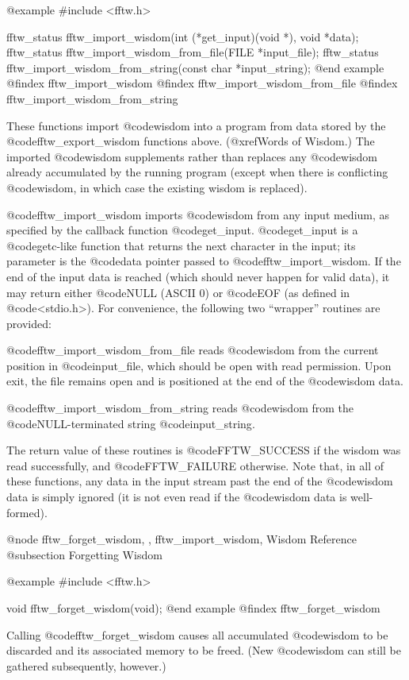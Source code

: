 @example
#include <fftw.h>

fftw_status fftw_import_wisdom(int (*get_input)(void *), void *data);
fftw_status fftw_import_wisdom_from_file(FILE *input_file);
fftw_status fftw_import_wisdom_from_string(const char *input_string);
@end example
@findex fftw_import_wisdom
@findex fftw_import_wisdom_from_file
@findex fftw_import_wisdom_from_string

These functions import @code{wisdom} into a program from data stored by
the @code{fftw_export_wisdom} functions above. (@xref{Words of Wisdom}.)
The imported @code{wisdom} supplements rather than replaces any
@code{wisdom} already accumulated by the running program (except when
there is conflicting @code{wisdom}, in which case the existing wisdom is
replaced).

@code{fftw_import_wisdom} imports @code{wisdom} from any input medium,
as specified by the callback function @code{get_input}. @code{get_input}
is a @code{getc}-like function that returns the next character in the
input; its parameter is the @code{data} pointer passed to
@code{fftw_import_wisdom}. If the end of the input data is reached
(which should never happen for valid data), it may return either
@code{NULL} (ASCII 0) or @code{EOF} (as defined in @code{<stdio.h>}).
For convenience, the following two ``wrapper'' routines are provided:

@code{fftw_import_wisdom_from_file} reads @code{wisdom} from the
current position in @code{input_file}, which should be open with read
permission.  Upon exit, the file remains open and is positioned at the
end of the @code{wisdom} data.

@code{fftw_import_wisdom_from_string} reads @code{wisdom} from the
@code{NULL}-terminated string @code{input_string}.

The return value of these routines is @code{FFTW_SUCCESS} if the wisdom
was read successfully, and @code{FFTW_FAILURE} otherwise. Note that, in
all of these functions, any data in the input stream past the end of the
@code{wisdom} data is simply ignored (it is not even read if the
@code{wisdom} data is well-formed).

@node    fftw_forget_wisdom,  , fftw_import_wisdom, Wisdom Reference
@subsection Forgetting Wisdom

@example
#include <fftw.h>

void fftw_forget_wisdom(void);
@end example
@findex fftw_forget_wisdom

Calling @code{fftw_forget_wisdom} causes all accumulated @code{wisdom}
to be discarded and its associated memory to be freed. (New
@code{wisdom} can still be gathered subsequently, however.)

